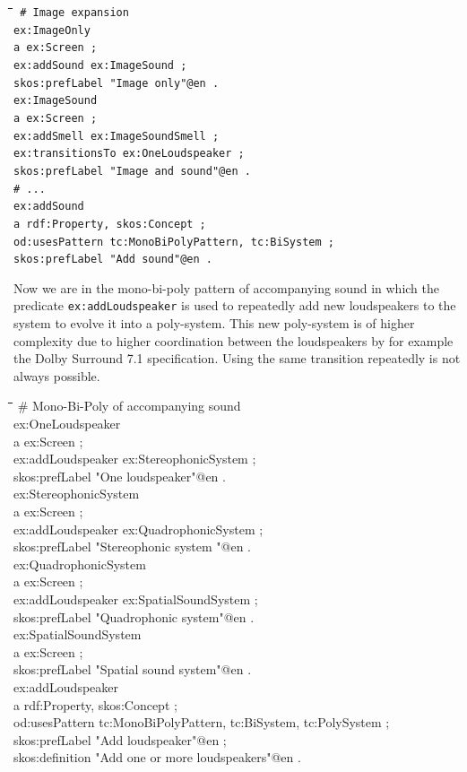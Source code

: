 \documentclass[11pt,a4paper]{article}
\newenvironment{code}{\tt \begin{tabbing}
\hskip12pt\=\hskip12pt\=\hskip12pt\=\hskip12pt\=\hskip5cm\=\hskip5cm\=\kill}
{\end{tabbing}}
\begin{document}
\begin{code}\tt
\# Image expansion\\[4pt]
ex:ImageOnly\\
\> a ex:Screen ;\\
\> ex:addSound ex:ImageSound ;\\
\> skos:prefLabel "Image only"@en .\\[4pt]
ex:ImageSound \\
\> a ex:Screen ; \\
\> ex:addSmell ex:ImageSoundSmell ;\\
\> ex:transitionsTo ex:OneLoudspeaker ;\\
\> skos:prefLabel "Image and sound"@en .\\[4pt]
\# ...\\[4pt]
ex:addSound\\
\> a rdf:Property, skos:Concept ;\\
\> od:usesPattern tc:MonoBiPolyPattern, tc:BiSystem ;\\
\> skos:prefLabel "Add sound"@en .
\end{code}

Now we are in the mono-bi-poly pattern of accompanying sound in which the
predicate \texttt{ex:addLoudspeaker} is used to repeatedly add new
loudspeakers to the system to evolve it into a poly-system. This new
poly-system is of higher complexity due to higher coordination between the
loudspeakers by for example the Dolby Surround 7.1 specification. Using the
same transition repeatedly is not always possible. 

\begin{code}
\# Mono-Bi-Poly of accompanying sound\\[4pt]
ex:OneLoudspeaker \\
\> a ex:Screen ;\\
\> ex:addLoudspeaker ex:StereophonicSystem ;\\
\> skos:prefLabel "One loudspeaker"@en .\\[4pt]
ex:StereophonicSystem \\
\> a ex:Screen ; \\
\> ex:addLoudspeaker ex:QuadrophonicSystem ;\\
\> skos:prefLabel "Stereophonic system "@en .\\[4pt]
ex:QuadrophonicSystem \\
\> a ex:Screen ; \\
\> ex:addLoudspeaker ex:SpatialSoundSystem ;\\
\> skos:prefLabel "Quadrophonic system"@en .\\[4pt]
ex:SpatialSoundSystem\\
\> a ex:Screen ; \\
\> skos:prefLabel "Spatial sound system"@en .\\[4pt]
ex:addLoudspeaker\\
\> a rdf:Property, skos:Concept ;\\
\> od:usesPattern tc:MonoBiPolyPattern, tc:BiSystem, tc:PolySystem ;\\
\> skos:prefLabel "Add loudspeaker"@en ;\\
\> skos:definition "Add one or more loudspeakers"@en .
\end{code}
\end{document}
